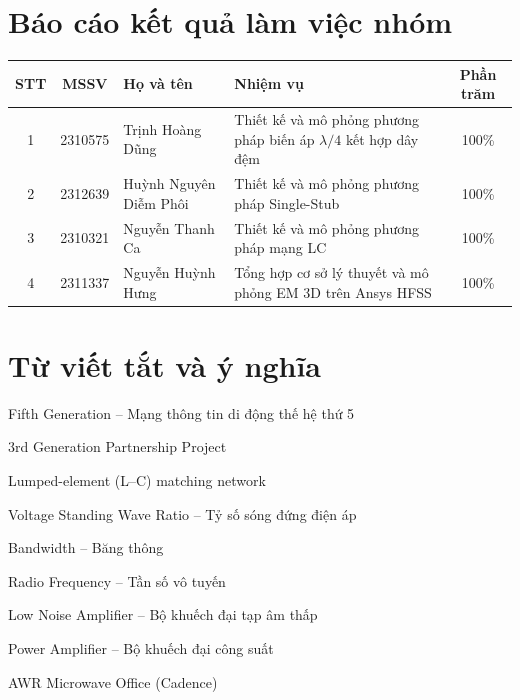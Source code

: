 \documentclass[a4paper]{report}
\begin{document}
\phantruoc
\taobiatruoc

\chapter*{Báo cáo kết quả làm việc nhóm}
\begin{center}
\renewcommand\arraystretch{1.6}
\begin{tabular}{|c|c|p{42mm}|p{40mm}|c|}
\hline
\textbf{STT} & \textbf{MSSV} & \textbf{Họ và tên} & \textbf{Nhiệm vụ} & \textbf{Phần trăm} \\ \hline
1 & 2310575 & Trịnh Hoàng Dũng & Thiết kế và mô phỏng phương pháp biến áp $\lambda/4$ kết hợp dây đệm & 100\% \\ \hline
2 & 2312639 & Huỳnh Nguyên Diễm Phôi & Thiết kế và mô phỏng phương pháp Single-Stub & 100\% \\ \hline
3 & 2310321 & Nguyễn Thanh Ca & Thiết kế và mô phỏng phương pháp mạng LC & 100\% \\ \hline
4 & 2311337 & Nguyễn Huỳnh Hưng & Tổng hợp cơ sở lý thuyết và mô phỏng EM 3D trên Ansys HFSS & 100\% \\ \hline
\end{tabular}
\end{center}

\cleardoublepage
\tableofcontents

\cleardoublepage
\chapter*{Từ viết tắt và ý nghĩa}
\begin{tuviettat}
\item[5G] Fifth Generation – Mạng thông tin di động thế hệ thứ 5
\item[3GPP] 3rd Generation Partnership Project
\item[LC] Lumped-element (L–C) matching network
\item[VSWR] Voltage Standing Wave Ratio – Tỷ số sóng đứng điện áp
\item[BW] Bandwidth – Băng thông
\item[RF] Radio Frequency – Tần số vô tuyến
\item[LNA] Low Noise Amplifier – Bộ khuếch đại tạp âm thấp
\item[PA] Power Amplifier – Bộ khuếch đại công suất
\item[AWR] AWR Microwave Office (Cadence)
\end{tuviettat}
\end{document}
